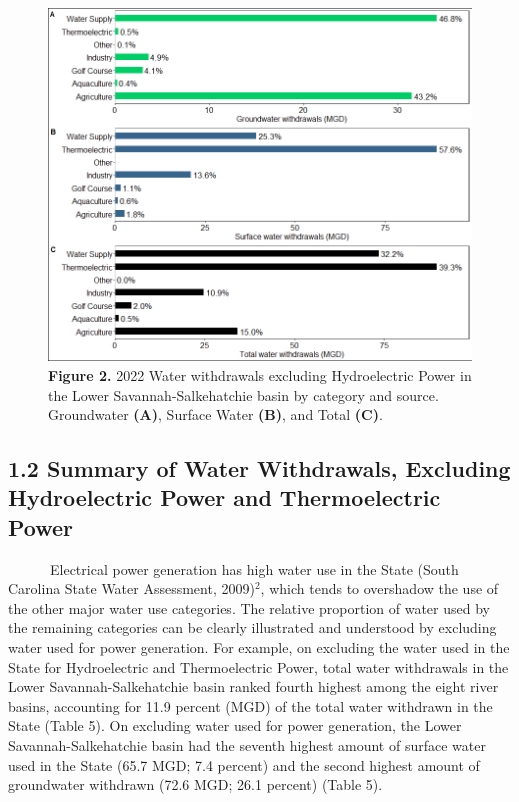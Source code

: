 \documentclass[
]{article}
\begin{document}
\begin{figure}[H]

{\centering \includegraphics{LSS_figures/combine-bar-plots-noPH-1} 

}

\caption{\textbf{Figure 2.} 2022 Water withdrawals excluding Hydroelectric Power in the Lower Savannah-Salkehatchie basin by category and source. Groundwater \textbf{(A)}, Surface Water \textbf{(B)}, and Total \textbf{(C)}.}\label{fig:combine-bar-plots-noPH}
\end{figure}

\newpage

\hypertarget{summary-of-water-withdrawals-excluding-hydroelectric-power-and-thermoelectric-power}{%
\subsection{1.2 Summary of Water Withdrawals, Excluding Hydroelectric
Power and Thermoelectric
Power}\label{summary-of-water-withdrawals-excluding-hydroelectric-power-and-thermoelectric-power}}

~~~~~~Electrical power generation has high water use in the State (South
Carolina State Water Assessment, 2009)\(^2\), which tends to overshadow
the use of the other major water use categories. The relative proportion
of water used by the remaining categories can be clearly illustrated and
understood by excluding water used for power generation. For example, on
excluding the water used in the State for Hydroelectric and
Thermoelectric Power, total water withdrawals in the Lower
Savannah-Salkehatchie basin ranked fourth highest among the eight river
basins, accounting for 11.9 percent (MGD) of the total water withdrawn
in the State (Table 5). On excluding water used for power generation,
the Lower Savannah-Salkehatchie basin had the seventh highest amount of
surface water used in the State (65.7 MGD; 7.4 percent) and the second
highest amount of groundwater withdrawn (72.6 MGD; 26.1 percent) (Table
5).
\end{document}
